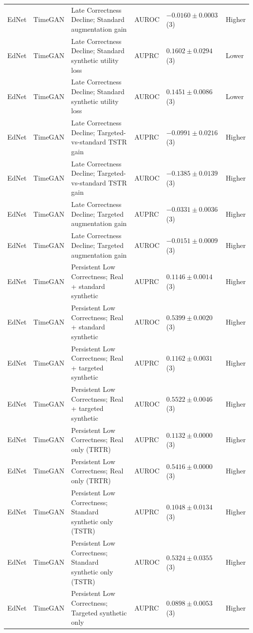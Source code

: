 \begin{longtable}{@{}p{2.25cm}p{2.05cm}p{4.7cm}p{5.0cm}p{2.6cm}p{1.25cm}@{}}
EdNet & TimeGAN & Late Correctness Decline; Standard augmentation gain & AUROC & $-0.0160 \mathbin{\pm} 0.0003$ (3) & Higher \\
EdNet & TimeGAN & Late Correctness Decline; Standard synthetic utility loss & AUPRC & $0.1602 \mathbin{\pm} 0.0294$ (3) & Lower \\
EdNet & TimeGAN & Late Correctness Decline; Standard synthetic utility loss & AUROC & $0.1451 \mathbin{\pm} 0.0086$ (3) & Lower \\
EdNet & TimeGAN & Late Correctness Decline; Targeted-vs-standard TSTR gain & AUPRC & $-0.0991 \mathbin{\pm} 0.0216$ (3) & Higher \\
EdNet & TimeGAN & Late Correctness Decline; Targeted-vs-standard TSTR gain & AUROC & $-0.1385 \mathbin{\pm} 0.0139$ (3) & Higher \\
EdNet & TimeGAN & Late Correctness Decline; Targeted augmentation gain & AUPRC & $-0.0331 \mathbin{\pm} 0.0036$ (3) & Higher \\
EdNet & TimeGAN & Late Correctness Decline; Targeted augmentation gain & AUROC & $-0.0151 \mathbin{\pm} 0.0009$ (3) & Higher \\
EdNet & TimeGAN & Persistent Low Correctness; Real + standard synthetic & AUPRC & $0.1146 \mathbin{\pm} 0.0014$ (3) & Higher \\
EdNet & TimeGAN & Persistent Low Correctness; Real + standard synthetic & AUROC & $0.5399 \mathbin{\pm} 0.0020$ (3) & Higher \\
EdNet & TimeGAN & Persistent Low Correctness; Real + targeted synthetic & AUPRC & $0.1162 \mathbin{\pm} 0.0031$ (3) & Higher \\
EdNet & TimeGAN & Persistent Low Correctness; Real + targeted synthetic & AUROC & $0.5522 \mathbin{\pm} 0.0046$ (3) & Higher \\
EdNet & TimeGAN & Persistent Low Correctness; Real only (TRTR) & AUPRC & $0.1132 \mathbin{\pm} 0.0000$ (3) & Higher \\
EdNet & TimeGAN & Persistent Low Correctness; Real only (TRTR) & AUROC & $0.5416 \mathbin{\pm} 0.0000$ (3) & Higher \\
EdNet & TimeGAN & Persistent Low Correctness; Standard synthetic only (TSTR) & AUPRC & $0.1048 \mathbin{\pm} 0.0134$ (3) & Higher \\
EdNet & TimeGAN & Persistent Low Correctness; Standard synthetic only (TSTR) & AUROC & $0.5324 \mathbin{\pm} 0.0355$ (3) & Higher \\
EdNet & TimeGAN & Persistent Low Correctness; Targeted synthetic only & AUPRC & $0.0898 \mathbin{\pm} 0.0053$ (3) & Higher \\

\end{longtable}
